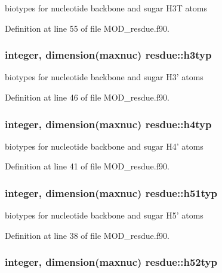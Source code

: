 biotypes for nucleotide backbone and sugar H3\-T atoms 



Definition at line 55 of file M\-O\-D\-\_\-resdue.\-f90.

\hypertarget{classresdue_a5c59bc8e2a978ecd0112210b0cb0f23a}{
\subsubsection[{h3typ}]{\setlength{\rightskip}{0pt plus 5cm}integer, dimension(maxnuc) resdue\-::h3typ}}\label{classresdue_a5c59bc8e2a978ecd0112210b0cb0f23a}


biotypes for nucleotide backbone and sugar H3' atoms 



Definition at line 46 of file M\-O\-D\-\_\-resdue.\-f90.

\hypertarget{classresdue_aaeadfe458580a8c49cd4f5e145281242}{
\subsubsection[{h4typ}]{\setlength{\rightskip}{0pt plus 5cm}integer, dimension(maxnuc) resdue\-::h4typ}}\label{classresdue_aaeadfe458580a8c49cd4f5e145281242}


biotypes for nucleotide backbone and sugar H4' atoms 



Definition at line 41 of file M\-O\-D\-\_\-resdue.\-f90.

\hypertarget{classresdue_a9736062e8c8c235ef06de2f4b279d327}{
\subsubsection[{h51typ}]{\setlength{\rightskip}{0pt plus 5cm}integer, dimension(maxnuc) resdue\-::h51typ}}\label{classresdue_a9736062e8c8c235ef06de2f4b279d327}


biotypes for nucleotide backbone and sugar H5' atoms 



Definition at line 38 of file M\-O\-D\-\_\-resdue.\-f90.

\hypertarget{classresdue_a8d8b285ff85ed1830b08e4b3288334b5}{
\subsubsection[{h52typ}]{\setlength{\rightskip}{0pt plus 5cm}integer, dimension(maxnuc) resdue\-::h52typ}}\label{classresdue_a8d8b285ff85ed1830b08e4b3288334b5}


